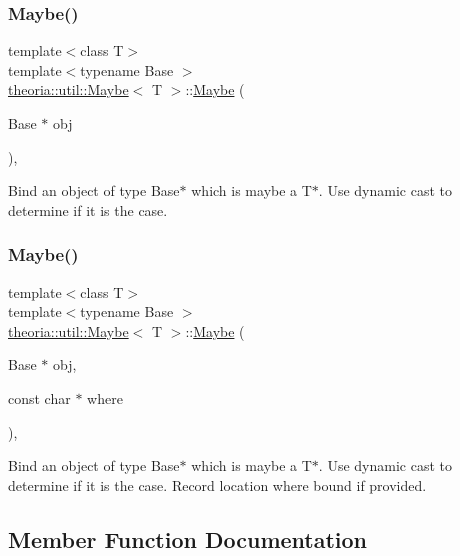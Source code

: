 \subsubsection{\texorpdfstring{Maybe()}{Maybe()}\hspace{0.1cm}{\footnotesize\ttfamily [3/4]}}
{\footnotesize\ttfamily template$<$class T$>$ \\
template$<$typename Base $>$ \\
\hyperlink{classtheoria_1_1util_1_1Maybe}{theoria\+::util\+::\+Maybe}$<$ T $>$\+::\hyperlink{classtheoria_1_1util_1_1Maybe}{Maybe} (\begin{DoxyParamCaption}\item[{Base $\ast$}]{obj }\end{DoxyParamCaption})\hspace{0.3cm}{\ttfamily [inline]}, {\ttfamily [explicit]}}

Bind an object of type Base$\ast$ which is maybe a T$\ast$. Use dynamic cast to determine if it is the case. \mbox{\label{classtheoria_1_1util_1_1Maybe_a955e6b90184ad9e054038ebbd8dab3c6}} 
\subsubsection{\texorpdfstring{Maybe()}{Maybe()}\hspace{0.1cm}{\footnotesize\ttfamily [4/4]}}
{\footnotesize\ttfamily template$<$class T$>$ \\
template$<$typename Base $>$ \\
\hyperlink{classtheoria_1_1util_1_1Maybe}{theoria\+::util\+::\+Maybe}$<$ T $>$\+::\hyperlink{classtheoria_1_1util_1_1Maybe}{Maybe} (\begin{DoxyParamCaption}\item[{Base $\ast$}]{obj,  }\item[{const char $\ast$}]{where }\end{DoxyParamCaption})\hspace{0.3cm}{\ttfamily [inline]}, {\ttfamily [explicit]}}

Bind an object of type Base$\ast$ which is maybe a T$\ast$. Use dynamic cast to determine if it is the case. Record location where bound if provided. 

\subsection{Member Function Documentation}
\mbox{\label{classtheoria_1_1util_1_1Maybe_adfa406b81887a9dd40683e1c690d7367}} 
